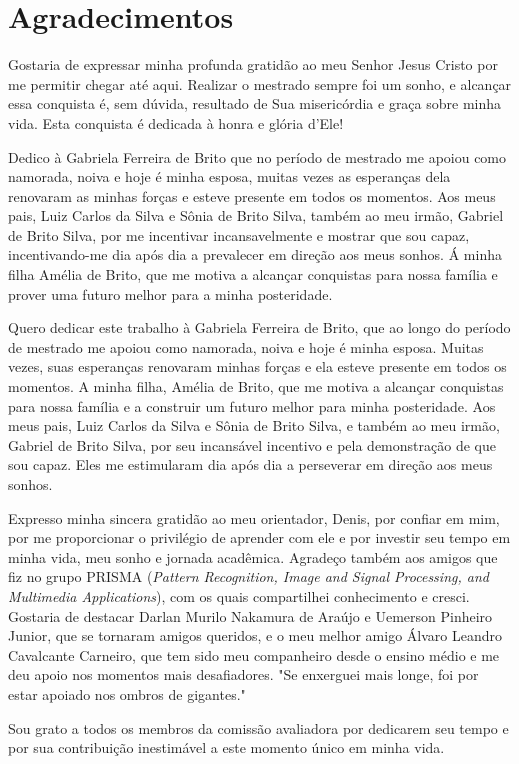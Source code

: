 \newpage
\thispagestyle{empty}
\section*{Agradecimentos}
Gostaria de expressar minha profunda gratidão ao meu Senhor Jesus Cristo por me permitir chegar até aqui. Realizar o mestrado sempre foi um sonho, e alcançar essa conquista é, sem dúvida, resultado de Sua misericórdia e graça sobre minha vida. Esta conquista é dedicada à honra e glória d'Ele!

Dedico à Gabriela Ferreira de Brito que no período de mestrado me apoiou como namorada, noiva e hoje é minha esposa, muitas vezes as esperanças dela renovaram as minhas forças e esteve presente em todos os momentos. Aos meus pais, Luiz Carlos da Silva e Sônia de Brito Silva, também ao meu irmão, Gabriel de Brito Silva, por me incentivar incansavelmente e mostrar que sou capaz, incentivando-me dia após dia a prevalecer em direção aos meus sonhos. Á minha filha Amélia de Brito, que me motiva a alcançar conquistas para nossa família e prover uma futuro melhor para a minha posteridade.

Quero dedicar este trabalho à Gabriela Ferreira de Brito, que ao longo do período de mestrado me apoiou como namorada, noiva e hoje é minha esposa. Muitas vezes, suas esperanças renovaram minhas forças e ela esteve presente em todos os momentos. A minha filha, Amélia de Brito, que me motiva a alcançar conquistas para nossa família e a construir um futuro melhor para minha posteridade. Aos meus pais, Luiz Carlos da Silva e Sônia de Brito Silva, e também ao meu irmão, Gabriel de Brito Silva, por seu incansável incentivo e pela demonstração de que sou capaz. Eles me estimularam dia após dia a perseverar em direção aos meus sonhos.

Expresso minha sincera gratidão ao meu orientador, Denis, por confiar em mim, por me proporcionar o privilégio de aprender com ele e por investir seu tempo em minha vida, meu sonho e jornada acadêmica. Agradeço também aos amigos que fiz no grupo PRISMA (\textit{Pattern Recognition, Image and Signal Processing, and Multimedia Applications}), com os quais compartilhei conhecimento e cresci. Gostaria de destacar Darlan Murilo Nakamura de Araújo e Uemerson Pinheiro Junior, que se tornaram amigos queridos, e o meu melhor amigo Álvaro Leandro Cavalcante Carneiro, que tem sido meu companheiro desde o ensino médio e me deu apoio nos momentos mais desafiadores. "Se enxerguei mais longe, foi por estar apoiado nos ombros de gigantes."

Sou grato a todos os membros da comissão avaliadora por dedicarem seu tempo e por sua contribuição inestimável a este momento único em minha vida.